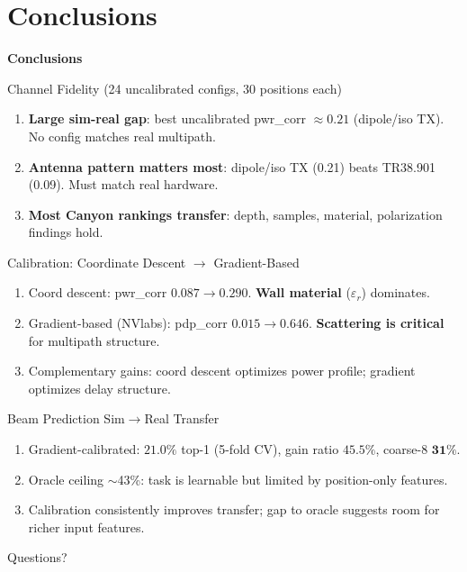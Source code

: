 \documentclass[
    aspectratio=169
]{beamer}
\begin{document}
\section{Conclusions}

\begin{frame}{\textbf{Conclusions}}
\footnotesize
\begin{block}{Channel Fidelity (24 uncalibrated configs, 30 positions each)}
\begin{enumerate}
    \item \textbf{Large sim-real gap}: best uncalibrated pwr\_corr $\approx 0.21$ (dipole/iso TX). No config matches real multipath.
    \item \textbf{Antenna pattern matters most}: dipole/iso TX (0.21) beats TR38.901 (0.09). Must match real hardware.
    \item \textbf{Most Canyon rankings transfer}: depth, samples, material, polarization findings hold.
\end{enumerate}
\end{block}

\begin{block}{Calibration: Coordinate Descent $\to$ Gradient-Based}
\begin{enumerate}
    \item Coord descent: pwr\_corr $0.087 \to \mathbf{0.290}$. \textbf{Wall material} ($\varepsilon_r$) dominates.
    \item Gradient-based (NVlabs): pdp\_corr $0.015 \to \mathbf{0.646}$. \textbf{Scattering is critical} for multipath structure.
    \item Complementary gains: coord descent optimizes power profile; gradient optimizes delay structure.
\end{enumerate}
\end{block}

\begin{block}{Beam Prediction Sim$\to$Real Transfer}
\begin{enumerate}
    \item Gradient-calibrated: $\mathbf{21.0\%}$ top-1 (5-fold CV), gain ratio $\mathbf{45.5\%}$, coarse-8 $\mathbf{31\%}$.
    \item Oracle ceiling $\sim$43\%: task is learnable but limited by position-only features.
    \item Calibration consistently improves transfer; gap to oracle suggests room for richer input features.
\end{enumerate}
\end{block}
\normalsize
\end{frame}


\begin{frame}
\begin{center}
    \Large Questions?
\end{center}
\end{frame}
\end{document}
